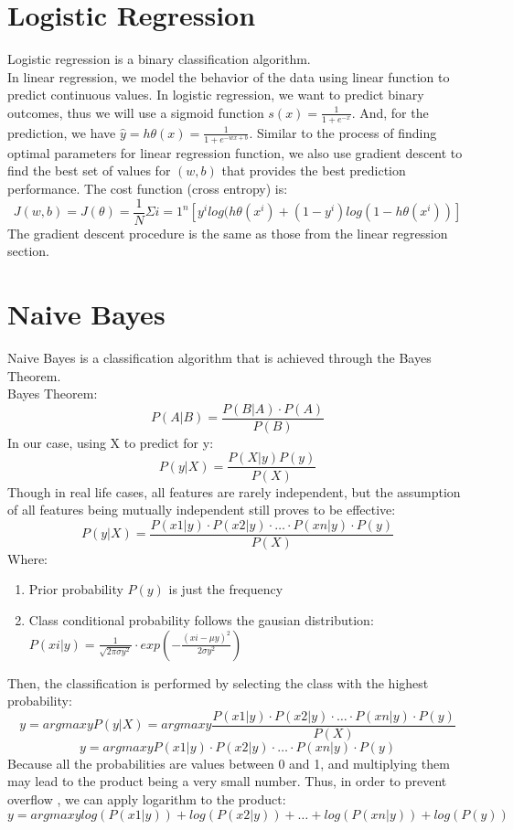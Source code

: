 \documentclass[12pt]{article}
\begin{document}
\section{Logistic Regression}
Logistic regression is a binary classification algorithm.\\
In linear regression, we model the behavior of the data using linear function to predict continuous values. In logistic regression, we want to predict binary outcomes, thus we will use a sigmoid function $s(x) = \frac{1}{1 + e^{-x}}$. And, for the prediction, we have $\hat{y} = h  {\theta}(x) = \frac{1}{1 + e^{-wx+b}}$. Similar to the process of finding optimal parameters for linear regression function, we also use gradient descent to find the best set of values for $(w, b)$ that provides the best prediction performance. The cost function (cross entropy) is:
$$J(w, b) = J(\theta) = \frac{1}{N}\Sigma  {i=1}^n[y^ilog(h  {\theta}(x^i) + (1-y^i)log(1 - h  {\theta}(x^i))]$$
The gradient descent procedure is the same as those from the linear regression section.  

\section{Naive Bayes}
Naive Bayes is a classification algorithm that is achieved through the Bayes Theorem.\\
Bayes Theorem:
$$P(A|B) = \frac{P(B|A)\cdot P(A)}{P(B)}$$
In our case, using X to predict for y:
$$P(y|X) = \frac{P(X|y)P(y)}{P(X)}$$
Though in real life cases, all features are rarely independent, but the assumption of all features being mutually independent still proves to be effective:
$$P(y|X) = \frac{P(x  1|y)\cdot P(x  2|y)\cdot \dots \cdot P(x  n|y)\cdot P(y)}{P(X)}$$
Where:
\begin{enumerate}
	\item Prior probability $P(y)$ is just the frequency
	\item Class conditional probability follows the gausian distribution: $P(x  i|y) = \frac{1}{\sqrt{2\pi \sigma  y^2}}\cdot
exp(-\frac{(x  i - \mu  y)^2}{2\sigma  y^2})$
\end{enumerate}
Then, the classification is performed by selecting the class with the highest probability:
$$y = argmax  yP(y|X) = argmax  y\frac{P(x  1|y)\cdot P(x  2|y)\cdot \dots \cdot P(x  n|y)\cdot P(y)}{P(X)}$$
$$y = argmax  yP(x  1|y)\cdot P(x  2|y)\cdot \dots \cdot P(x  n|y)\cdot P(y)$$
Because all the probabilities are values between 0 and 1, and multiplying them may lead to the product being a very small number. Thus, in order to prevent   overflow  , we can apply logarithm to the product:
$$y = argmax  ylog(P(x  1|y)) + log(P(x  2|y)) + \dots + log(P(x  n|y)) + log(P(y))$$
\end{document}
